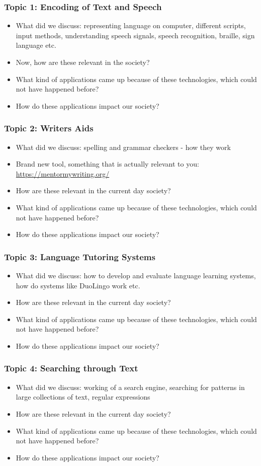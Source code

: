 \documentclass{beamer}
\begin{document}
\begin{frame}
\frametitle{Topic 1: Encoding of Text and Speech}
\begin{itemize}
\item What did we discuss: representing language on computer, different scripts, input methods, understanding speech signals, speech recognition, braille, sign language etc.
\item Now, how are these relevant in the society?
\item What kind of applications came up because of these technologies, which could not have happened before?
\item How do these applications impact our society? 

\end{itemize}
\end{frame}

\begin{frame}
\frametitle{Topic 2: Writers Aids}
\begin{itemize}
\item What did we discuss: spelling and grammar checkers - how they work
\item Brand new tool, something that is actually relevant to you: \url{https://mentormywriting.org/} \pause
\item How are these relevant in the current day society?
\item What kind of applications came up because of these technologies, which could not have happened before?
\item How do these applications impact our society? 
\end{itemize}
\end{frame}

\begin{frame}
\frametitle{Topic 3: Language Tutoring Systems}
\begin{itemize}
\item What did we discuss: how to develop and evaluate language learning systems, how do systems like DuoLingo work etc.
\item How are these relevant in the current day society?
\item What kind of applications came up because of these technologies, which could not have happened before?
\item How do these applications impact our society? 
\end{itemize}
\end{frame}

\begin{frame}
\frametitle{Topic 4: Searching through Text}
\begin{itemize}
\item What did we discuss: working of a search engine, searching for patterns in large collections of text, regular expressions
\item How are these relevant in the current day society?
\item What kind of applications came up because of these technologies, which could not have happened before?
\item How do these applications impact our society? 
\end{itemize}
\end{frame}
\end{document}

